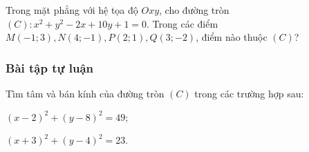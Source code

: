 \begin{vd}%
	Trong mặt phẳng với hệ tọa độ $Oxy$, cho đường tròn $(C) \colon x^2+y^2-2x+10y+1=0$. Trong các điểm $M(-1;3),N(4;-1),P(2;1),Q(3;-2)$, điểm nào thuộc $(C)$?
\end{vd}

\subsubsection{Bài tập tự luận}
\begin{bt}%
	 Tìm tâm và bán kính của đường tròn $(C)$ trong các trường hợp sau:
	\begin{enumEX}{2}
		\item $(x-2)^2+(y-8)^2=49$;
		\item $(x+3)^2+(y-4)^2=23$.
	\end{enumEX}
\end{bt}

